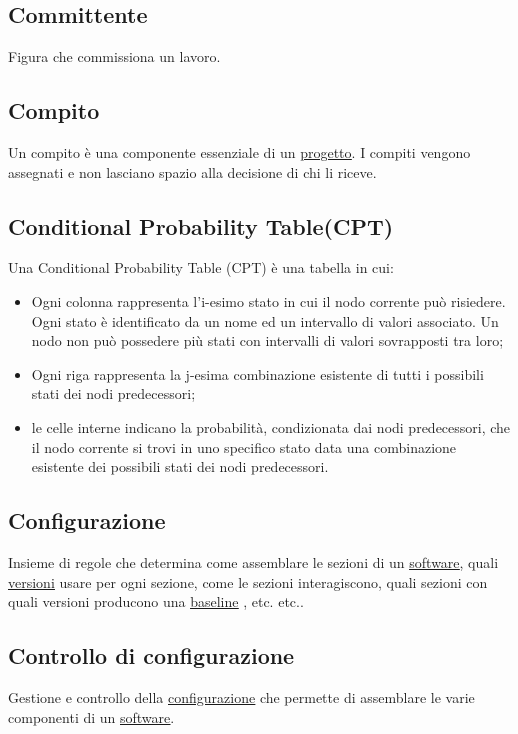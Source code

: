 	\subsection{Committente}
	\label{sec:committente}
	Figura che commissiona un lavoro.
	
	\subsection{Compito}
	\label{sec:compito}
	Un compito è una componente essenziale di un \underline{\hyperref[sec:progetto]{progetto}}. I compiti vengono assegnati e non lasciano spazio alla decisione di chi li riceve.

	
	\subsection{Conditional Probability Table(CPT)}
	\label{sec:CPT}
	Una Conditional Probability Table (CPT) è una tabella in cui:
		\begin{itemize}
			\item{Ogni colonna rappresenta l'i-esimo stato in cui il nodo corrente può risiedere. Ogni stato è identificato da un nome ed un intervallo di valori associato. Un nodo non può possedere più stati con intervalli di valori sovrapposti tra loro;}
			\item{Ogni riga rappresenta la j-esima combinazione esistente di tutti i possibili stati dei nodi predecessori;}
			\item{le celle interne indicano la probabilità, condizionata dai nodi predecessori, che il nodo corrente si trovi in uno specifico stato data una combinazione esistente dei possibili stati dei nodi predecessori.}
		\end{itemize}

	
	\subsection{Configurazione}
	\label{sec:configurazione}
	Insieme di regole che determina come assemblare le sezioni di un \underline{\hyperref[sec:prodottosoftware]{software}}, quali \underline{\hyperref[sec:versione]{versioni}} usare per ogni sezione, come le sezioni interagiscono, quali sezioni con quali versioni producono una \underline{\hyperref[sec:baseline]{baseline}} , etc. etc..


	\subsection{Controllo di configurazione}
	\label{sec:controlloconfigurazione}
	Gestione e controllo della \underline{\hyperref[sec:configurazione]{configurazione}} che permette di assemblare le varie componenti di un \underline{\hyperref[sec:prodottosoftware]{software}}.


